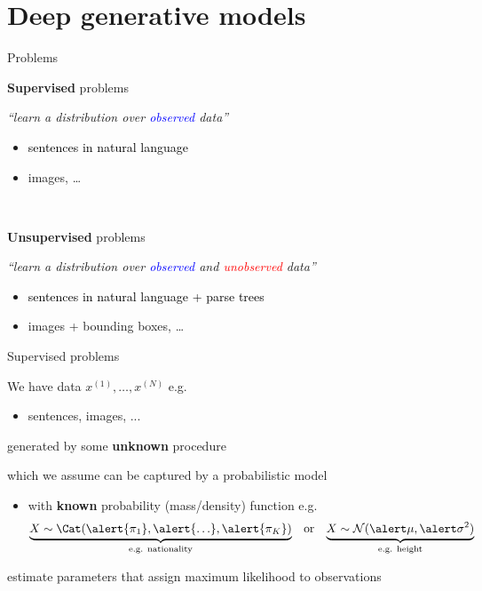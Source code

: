 \section{Deep generative models}


\begin{frame}{Problems}

{\bf Supervised} problems
\begin{center}\emph{``learn a distribution over \textcolor{blue}{observed} data''}\end{center}

\begin{itemize}
	\item \textcolor{black}{sentences in natural language}
	\item images, \ldots
\end{itemize}

~ \pause

{\bf Unsupervised} problems
\begin{center}\emph{``learn a distribution over \textcolor{blue}{observed} and \textcolor{red}{unobserved} data''}\end{center}
\begin{itemize}
	\item \textcolor{black}{sentences in natural language + parse trees}
	\item images + bounding boxes, \ldots
\end{itemize}
\end{frame}


\begin{frame}{Supervised problems}

\small

We have data $x^{(1)}, \ldots, x^{(N)}$ e.g.  \\
\begin{itemize}
	\item sentences, images, ...
\end{itemize}
generated by some {\bf unknown} procedure

\pause

which we assume can be captured by a probabilistic model

\pause

\begin{itemize}
	\item with {\bf known} probability (mass/density) function e.g.
	\begin{align*}
    \underbrace{X \sim \Cat(\alert{\pi_1}, \alert{\ldots}, \alert{\pi_K})}_{\text{e.g. nationality}} & & \text{or} & & \underbrace{X \sim \mathcal N(\alert\mu, \alert\sigma^2)}_{\text{e.g. height}}
    \end{align*}    
\end{itemize}
\pause
\alert{estimate parameters} that assign maximum likelihood to observations


\end{frame}

